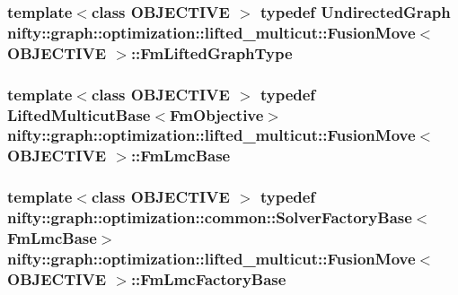 \subsubsection[{Fm\+Lifted\+Graph\+Type}]{\setlength{\rightskip}{0pt plus 5cm}template$<$class O\+B\+J\+E\+C\+T\+I\+V\+E $>$ typedef {\bf Undirected\+Graph} {\bf nifty\+::graph\+::optimization\+::lifted\+\_\+multicut\+::\+Fusion\+Move}$<$ O\+B\+J\+E\+C\+T\+I\+V\+E $>$\+::{\bf Fm\+Lifted\+Graph\+Type}}\label{classnifty_1_1graph_1_1optimization_1_1lifted__multicut_1_1FusionMove_a1036b9c07018d8278e2d427cf00eac95}
\hypertarget{classnifty_1_1graph_1_1optimization_1_1lifted__multicut_1_1FusionMove_a297573c2512b2c29c266affb3f77c8a8}{}
\subsubsection[{Fm\+Lmc\+Base}]{\setlength{\rightskip}{0pt plus 5cm}template$<$class O\+B\+J\+E\+C\+T\+I\+V\+E $>$ typedef {\bf Lifted\+Multicut\+Base}$<${\bf Fm\+Objective}$>$ {\bf nifty\+::graph\+::optimization\+::lifted\+\_\+multicut\+::\+Fusion\+Move}$<$ O\+B\+J\+E\+C\+T\+I\+V\+E $>$\+::{\bf Fm\+Lmc\+Base}}\label{classnifty_1_1graph_1_1optimization_1_1lifted__multicut_1_1FusionMove_a297573c2512b2c29c266affb3f77c8a8}
\hypertarget{classnifty_1_1graph_1_1optimization_1_1lifted__multicut_1_1FusionMove_ab8f8704d7ac394b6af5fba1341cc5a94}{}
\subsubsection[{Fm\+Lmc\+Factory\+Base}]{\setlength{\rightskip}{0pt plus 5cm}template$<$class O\+B\+J\+E\+C\+T\+I\+V\+E $>$ typedef {\bf nifty\+::graph\+::optimization\+::common\+::\+Solver\+Factory\+Base}$<${\bf Fm\+Lmc\+Base}$>$ {\bf nifty\+::graph\+::optimization\+::lifted\+\_\+multicut\+::\+Fusion\+Move}$<$ O\+B\+J\+E\+C\+T\+I\+V\+E $>$\+::{\bf Fm\+Lmc\+Factory\+Base}}\label{classnifty_1_1graph_1_1optimization_1_1lifted__multicut_1_1FusionMove_ab8f8704d7ac394b6af5fba1341cc5a94}
\hypertarget{classnifty_1_1graph_1_1optimization_1_1lifted__multicut_1_1FusionMove_a75960ab42a29eff2ad1a8ca0be088a93}{}
